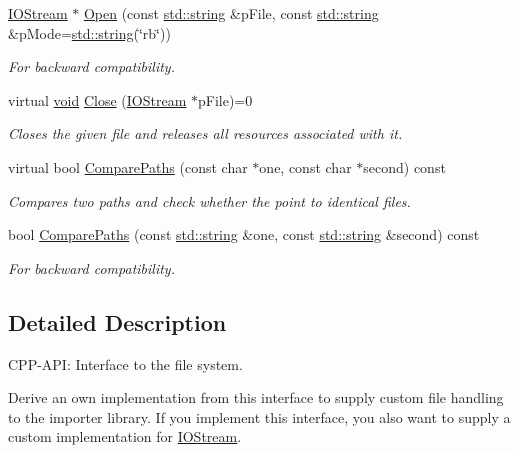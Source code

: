 \begin{DoxyCompactItemize}
\hyperlink{class_assimp_1_1_i_o_stream}{I\-O\-Stream} $\ast$ \hyperlink{class_assimp_1_1_i_o_system_aef35fabc9bd49fb83bfd4f12a94083c3}{Open} (const \hyperlink{_s_d_l__opengl_8h_a4643b88e2349494c65861169f8944eca}{std\-::string} \&p\-File, const \hyperlink{_s_d_l__opengl_8h_a4643b88e2349494c65861169f8944eca}{std\-::string} \&p\-Mode=\hyperlink{_s_d_l__opengl_8h_a4643b88e2349494c65861169f8944eca}{std\-::string}(\char`\"{}rb\char`\"{}))
\begin{DoxyCompactList}\small\item\em For backward compatibility. \end{DoxyCompactList}\item 
virtual \hyperlink{_s_d_l__opengl_8h_a3db05964a3cc4410f35b7ea2b7eb850d}{void} \hyperlink{class_assimp_1_1_i_o_system_a8c334d60f04bceeb6bd0157d21723f3e}{Close} (\hyperlink{class_assimp_1_1_i_o_stream}{I\-O\-Stream} $\ast$p\-File)=0
\begin{DoxyCompactList}\small\item\em Closes the given file and releases all resources associated with it. \end{DoxyCompactList}\item 
virtual bool \hyperlink{class_assimp_1_1_i_o_system_a11349a65b353ed62f655c3dd802b9062}{Compare\-Paths} (const char $\ast$one, const char $\ast$second) const 
\begin{DoxyCompactList}\small\item\em Compares two paths and check whether the point to identical files. \end{DoxyCompactList}\item 
bool \hyperlink{class_assimp_1_1_i_o_system_a279d1d4b0b2aa37800e222aad508dff1}{Compare\-Paths} (const \hyperlink{_s_d_l__opengl_8h_a4643b88e2349494c65861169f8944eca}{std\-::string} \&one, const \hyperlink{_s_d_l__opengl_8h_a4643b88e2349494c65861169f8944eca}{std\-::string} \&second) const 
\begin{DoxyCompactList}\small\item\em For backward compatibility. \end{DoxyCompactList}\end{DoxyCompactItemize}


\subsection{Detailed Description}
C\-P\-P-\/\-A\-P\-I\-: Interface to the file system. 

Derive an own implementation from this interface to supply custom file handling to the importer library. If you implement this interface, you also want to supply a custom implementation for \hyperlink{class_assimp_1_1_i_o_stream}{I\-O\-Stream}.

